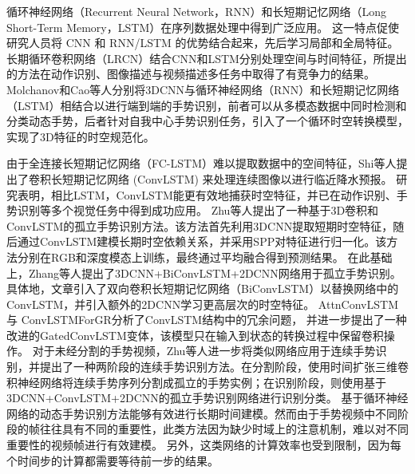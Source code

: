 循环神经网络（Recurrent Neural Network，RNN）\cite{jozefowicz2015empirical}和长短期记忆网络（Long Short-Term Memory，LSTM）\cite{yue2015beyond}在序列数据处理中得到广泛应用。
这一特点促使研究人员将 CNN 和 RNN/LSTM 的优势结合起来，先后学习局部和全局特征。
长期循环卷积网络（LRCN）\cite{donahue2015lrcn}结合CNN和LSTM分别处理空间与时间特征，所提出的方法在动作识别、图像描述与视频描述多任务中取得了有竞争力的结果。
Molchanov\cite{molchanov2016online}和Cao\cite{cao2017egocentric}等人分别将3DCNN与循环神经网络（RNN）和长短期记忆网络（LSTM）相结合以进行端到端的手势识别，前者可以从多模态数据中同时检测和分类动态手势，后者针对自我中心手势识别任务，引入了一个循环时空转换模型，实现了3D特征的时空规范化。

由于全连接长短期记忆网络（FC-LSTM）难以提取数据中的空间特征，Shi等人\cite{shi2015convlstm}提出了卷积长短期记忆网络 (ConvLSTM) 来处理连续图像以进行临近降水预报。
研究表明，相比LSTM，ConvLSTM能更有效地捕获时空特征，并已在动作识别、手势识别等多个视觉任务中得到成功应用。
Zhu等人\cite{zhu2017multimodal}提出了一种基于3D卷积和ConvLSTM的孤立手势识别方法。该方法首先利用3DCNN提取短期时空特征，随后通过ConvLSTM建模长期时空依赖关系，并采用SPP\cite{he2015spatial}对特征进行归一化。该方法分别在RGB和深度模态上训练，最终通过平均融合得到预测结果。
在此基础上，Zhang等人\cite{zhang2017learning}提出了3DCNN+BiConvLSTM+2DCNN网络用于孤立手势识别。具体地，文章引入了双向卷积长短期记忆网络（BiConvLSTM）以替换网络中的ConvLSTM，并引入额外的2DCNN学习更高层次的时空特征。
AttnConvLSTM\cite{zhang2018attention}与
ConvLSTMForGR\cite{zhu2019redundancy}分析了ConvLSTM结构中的冗余问题，
并进一步提出了一种改进的GatedConvLSTM变体，该模型只在输入到状态的转换过程中保留卷积操作。
对于未经分割的手势视频，Zhu等人\cite{zhu2018continuous}进一步将类似网络应用于连续手势识别，并提出了一种两阶段的连续手势识别方法。在分割阶段，使用时间扩张三维卷积神经网络将连续手势序列分割成孤立的手势实例；在识别阶段，则使用基于3DCNN+ConvLSTM+2DCNN的孤立手势识别网络进行识别分类。
基于循环神经网络的动态手势识别方法能够有效进行长期时间建模。然而由于手势视频中不同阶段的帧往往具有不同的重要性\cite{lin2018large}，此类方法因为缺少时域上的注意机制，难以对不同重要性的视频帧进行有效建模。
另外，这类网络的计算效率也受到限制，因为每个时间步的计算都需要等待前一步的结果。

